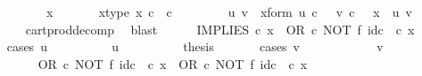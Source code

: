 \begin{isabellebody}
\ \ \isamarkupfalse%
\ {\isacharminus}{\kern0pt}\ \isanewline
\ \ \ \ \isamarkupfalse%
\ x\ \isanewline
\ \ \ \ \isamarkupfalse%
\ x{\isacharunderscore}{\kern0pt}type{\isacharcolon}{\kern0pt}\ {\isachardoublequoteopen}x\ {\isasymin}\isactrlsub c\ {\isasymOmega}\ {\isasymtimes}\isactrlsub c\ {\isasymOmega}{\isachardoublequoteclose}\isanewline
\ \ \ \ \isamarkupfalse%
\ \isamarkupfalse%
\ u\ v\ \ x{\isacharunderscore}{\kern0pt}form{\isacharcolon}{\kern0pt}\ {\isachardoublequoteopen}u\ {\isasymin}\isactrlsub c\ {\isasymOmega}\ {\isasymand}\ v\ {\isasymin}\isactrlsub c\ {\isasymOmega}\ {\isasymand}\ x\ {\isacharequal}{\kern0pt}\ {\isasymlangle}u{\isacharcomma}{\kern0pt}\ v{\isasymrangle}{\isachardoublequoteclose}\isanewline
\ \ \ \ \ \ \isamarkupfalse%
\ cart{\isacharunderscore}{\kern0pt}prod{\isacharunderscore}{\kern0pt}decomp\ \isamarkupfalse%
\ blast\isanewline
\ \ \ \ \isamarkupfalse%
\ {\isachardoublequoteopen}IMPLIES\ {\isasymcirc}\isactrlsub c\ x\ {\isacharequal}{\kern0pt}\ {\isacharparenleft}{\kern0pt}OR\ {\isasymcirc}\isactrlsub c\ NOT\ {\isasymtimes}\isactrlsub f\ id\isactrlsub c\ {\isasymOmega}{\isacharparenright}{\kern0pt}\ {\isasymcirc}\isactrlsub c\ x{\isachardoublequoteclose}\isanewline
\ \ \ \ \isamarkupfalse%
{\isacharparenleft}{\kern0pt}cases\ {\isachardoublequoteopen}u\ {\isacharequal}{\kern0pt}\ {\isasymt}{\isachardoublequoteclose}{\isacharparenright}{\kern0pt}\isanewline
\ \ \ \ \ \ \isamarkupfalse%
\ {\isachardoublequoteopen}u\ {\isacharequal}{\kern0pt}\ {\isasymt}{\isachardoublequoteclose}\isanewline
\ \ \ \ \ \ \isamarkupfalse%
\ {\isacharquery}{\kern0pt}thesis\isanewline
\ \ \ \ \ \ \isamarkupfalse%
{\isacharparenleft}{\kern0pt}cases\ {\isachardoublequoteopen}v\ {\isacharequal}{\kern0pt}\ {\isasymt}{\isachardoublequoteclose}{\isacharparenright}{\kern0pt}\isanewline
\ \ \ \ \ \ \ \ \isamarkupfalse%
\ {\isachardoublequoteopen}v\ {\isacharequal}{\kern0pt}\ {\isasymt}{\isachardoublequoteclose}\isanewline
\ \ \ \ \ \ \ \ \isamarkupfalse%
\ {\isachardoublequoteopen}{\isacharparenleft}{\kern0pt}OR\ {\isasymcirc}\isactrlsub c\ NOT\ {\isasymtimes}\isactrlsub f\ id\isactrlsub c\ {\isasymOmega}{\isacharparenright}{\kern0pt}\ {\isasymcirc}\isactrlsub c\ x\ {\isacharequal}{\kern0pt}\ OR\ {\isasymcirc}\isactrlsub c\ {\isacharparenleft}{\kern0pt}NOT\ {\isasymtimes}\isactrlsub f\ id\isactrlsub c\ {\isasymOmega}{\isacharparenright}{\kern0pt}\ {\isasymcirc}\isactrlsub c\ x{\isachardoublequoteclose}\isanewline

\end{isabellebody}
